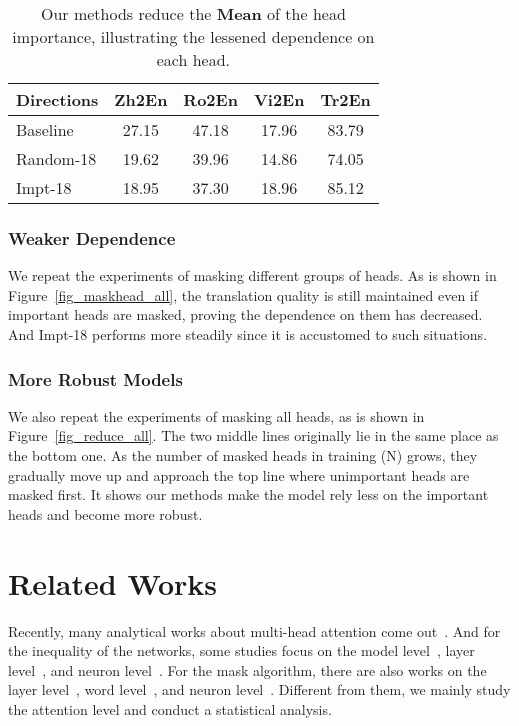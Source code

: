 \documentclass[11pt]{article}
\begin{document}
\begin{table}[h]\footnotesize
    \centering
    \begin{tabular}{lcccc}
        \hline
        Directions & Zh2En & Ro2En & Vi2En & Tr2En\\ \hline
        Baseline & 27.15 & 47.18 & 17.96 & 83.79 \\ 
        Random-18 & 19.62 & 39.96 & 14.86 & 74.05  \\
        Impt-18 & 18.95 & 37.30 & 18.96 & 85.12  \\ \hline
    \end{tabular}
    \caption{Our methods reduce the \textbf{Mean} of the head importance, illustrating the lessened dependence on each head.}
    \label{tab_maskhead_mean}
\end{table}

\subsubsection{Weaker Dependence}

We repeat the experiments of masking different groups of heads. As is shown in Figure~\ref{fig_maskhead_all}, the translation quality is still maintained even if important heads are masked, proving the dependence on them has decreased. And Impt-18 performs more steadily since it is accustomed to such situations.

\subsubsection{More Robust Models}

We also repeat the experiments of masking all heads, as is shown in Figure~\ref{fig_reduce_all}. The two middle lines originally lie in the same place as the bottom one. As the number of masked heads in training (N) grows, they gradually move up and approach the top line where unimportant heads are masked first. It shows our methods make the model rely less on the important heads and become more robust.


\section{Related Works}
 
Recently, many analytical works about multi-head attention come out~\cite{Raganato2018AnAO,tang2018analysis,Voita2019AnalyzingMS,Michel2019AreSH,sun2020generating,Behnke2020LosingHI}. And for the inequality of the networks, some studies focus on the model level~\cite{frankle2019lottery,sun2021multilingual}, layer level~\cite{zhang2019improving}, and neuron level~\cite{bau2019identifying}. For the mask algorithm, there are also works on the layer level~\cite{fan2020reducing}, word level~\cite{provilkov2019bpe}, and neuron level~\cite{Srivastava2014DropoutAS}. Different from them, we mainly study the attention level and conduct a statistical analysis.
\end{document}
